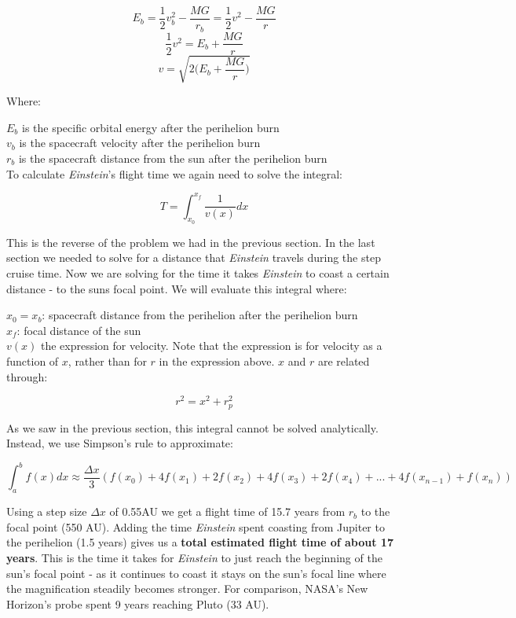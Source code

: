\documentclass[12pt]{article} %
\begin{document}
$$E_{b} = \frac{1}{2}v_b^2 - \frac{MG}{r_b} = \frac{1}{2}v^2-\frac{MG}{r}$$
$$\frac{1}{2}v^2 = E_b+\frac{MG}{r}$$
$$\boxed{v = \sqrt{2\big(E_b + \frac{MG}{r}\big)}}$$

Where:

$E_b$ is the specific orbital energy after the perihelion burn\\
$v_b$ is the spacecraft velocity after the perihelion burn\\
$r_b$ is the spacecraft distance from the sun after the perihelion burn\\

To calculate \textit{Einstein}'s flight time we again need to solve the integral:

$$T = \int_{x_0}^{x_f} \frac{1}{v(x)} dx$$

This is the reverse of the problem we had in the previous section. In the last section we needed to solve for a distance that \textit{Einstein} travels during the step cruise time. Now we are solving for the time it takes \textit{Einstein} to coast a certain distance - to the suns focal point. We will evaluate this integral where:

$x_0 = x_b$: spacecraft distance from the perihelion after the perihelion burn\\
$x_f$: focal distance of the sun\\
$v(x)$ the expression for velocity. Note that the expression is for velocity as a function of $x$, rather than for $r$ in the expression above. $x$ and $r$ are related through:

$$r^2 = x^2 + r_p^2$$

As we saw in the previous section, this integral cannot be solved analytically. Instead, we use Simpson's rule to approximate:

$$\int_a^b f(x) dx \approx \frac{\Delta x}{3} (f(x_0) + 4f(x_1)+ 2f(x_2) + 4f(x_3) + 2 f(x_4) + ... + 4f(x_{n-1}) + f(x_n))$$


Using a step size $\Delta x$ of 0.55AU we get a flight time of 15.7 years from $r_b$ to the focal point (550 AU). Adding the time \textit{Einstein} spent coasting from Jupiter to the perihelion (1.5 years) gives us a \textbf{total estimated flight time of about \textbf{17 years}}. This is the time it takes for \textit{Einstein} to just reach the beginning of the sun's focal point - as it continues to coast it stays on the sun's focal line where the magnification steadily becomes stronger. For comparison, NASA's New Horizon's probe spent 9 years reaching Pluto (33 AU).
\end{document}
